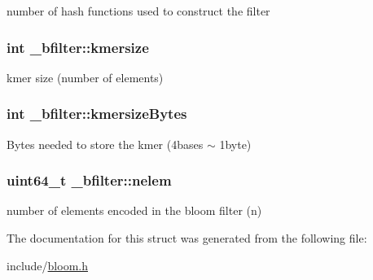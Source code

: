 number of hash functions used to construct the filter \hypertarget{struct__bfilter_aaccbef9fad8a88369249ff0638b2a032}{
\subsubsection[{kmersize}]{\setlength{\rightskip}{0pt plus 5cm}int \+\_\+bfilter\+::kmersize}}\label{struct__bfilter_aaccbef9fad8a88369249ff0638b2a032}
kmer size (number of elements) \hypertarget{struct__bfilter_aa7612223f56f3bb6cb40d96645bc982e}{
\subsubsection[{kmersize\+Bytes}]{\setlength{\rightskip}{0pt plus 5cm}int \+\_\+bfilter\+::kmersize\+Bytes}}\label{struct__bfilter_aa7612223f56f3bb6cb40d96645bc982e}
Bytes needed to store the kmer (4bases $\sim$ 1byte) \hypertarget{struct__bfilter_afdabad504407bfdee536cf67c66303c4}{
\subsubsection[{nelem}]{\setlength{\rightskip}{0pt plus 5cm}uint64\+\_\+t \+\_\+bfilter\+::nelem}}\label{struct__bfilter_afdabad504407bfdee536cf67c66303c4}
number of elements encoded in the bloom filter (n) 

The documentation for this struct was generated from the following file\+:\begin{DoxyCompactItemize}
\item 
include/\hyperlink{bloom_8h}{bloom.\+h}\end{DoxyCompactItemize}
